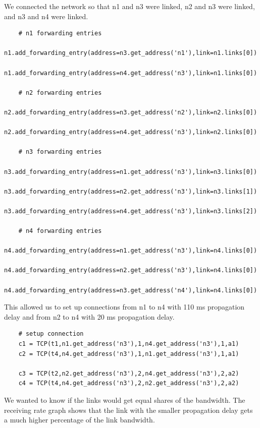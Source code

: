 \documentclass[11pt]{article}
\begin{document}
\vspace{5mm}

We connected the network so that n1 and n3 were linked, n2 and n3 were linked, and n3 and n4 were linked.

\vspace{5mm}

\begin{lstlisting}
    # n1 forwarding entries
    n1.add_forwarding_entry(address=n3.get_address('n1'),link=n1.links[0])
    n1.add_forwarding_entry(address=n4.get_address('n3'),link=n1.links[0])

    # n2 forwarding entries
    n2.add_forwarding_entry(address=n3.get_address('n2'),link=n2.links[0])
    n2.add_forwarding_entry(address=n4.get_address('n3'),link=n2.links[0])

    # n3 forwarding entries
    n3.add_forwarding_entry(address=n1.get_address('n3'),link=n3.links[0])
    n3.add_forwarding_entry(address=n2.get_address('n3'),link=n3.links[1])
    n3.add_forwarding_entry(address=n4.get_address('n3'),link=n3.links[2])

    # n4 forwarding entries
    n4.add_forwarding_entry(address=n1.get_address('n3'),link=n4.links[0])
    n4.add_forwarding_entry(address=n2.get_address('n3'),link=n4.links[0])
    n4.add_forwarding_entry(address=n3.get_address('n4'),link=n4.links[0])
\end{lstlisting}

\vspace{5mm}

This allowed us to set up connections from n1 to n4 with 110 ms propagation delay and from n2 to n4 with 20 ms propagation delay.

\vspace{5mm}

\begin{lstlisting}
    # setup connection
    c1 = TCP(t1,n1.get_address('n3'),1,n4.get_address('n3'),1,a1)
    c2 = TCP(t4,n4.get_address('n3'),1,n1.get_address('n3'),1,a1)

    c3 = TCP(t2,n2.get_address('n3'),2,n4.get_address('n3'),2,a2)
    c4 = TCP(t4,n4.get_address('n3'),2,n2.get_address('n3'),2,a2)
\end{lstlisting}

\vspace{5mm}

We wanted to know if the links would get equal shares of the bandwidth. The receiving rate graph shows that the link with the smaller propagation delay gets a much higher percentage of the link bandwidth.
\end{document}
